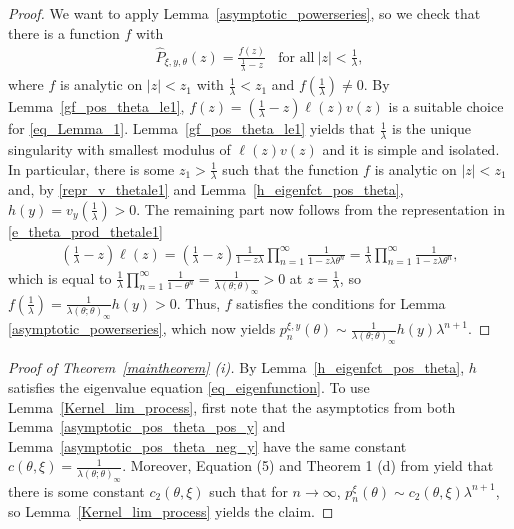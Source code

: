 \documentclass[12pt]{article}
\newcommand{\1}{\mathds{1}}
\theoremstyle{definition}
\theoremstyle{plain}
\theoremstyle{remark}
\begin{document}
\begin{proof}
    We want to apply Lemma~\ref{asymptotic_powerseries}, so we check that there is a function $f$ with
    \begin{align}
        \hat{P}_{\xi,y,\theta}(z)=\frac{f(z)}{\frac{1}{\lambda}-z}~~~~\text{for all}~|z|<\frac{1}{\lambda}\label{eq_Lemma_1},
    \end{align}
   where $f$ is analytic on $|z|<z_1$ with $\frac{1}{\lambda}<z_1$ and $f\left(\frac{1}{\lambda}\right)\neq 0$. 
   By Lemma~\ref{gf_pos_theta_le1}, $f(z)=\left(\frac{1}{\lambda}-z\right)\ell(z)v(z)$  is a suitable choice for \eqref{eq_Lemma_1}. Lemma~\ref{gf_pos_theta_le1} yields that $\frac{1}{\lambda}$ is the unique singularity with smallest modulus of $\ell(z)v(z)$ and it is simple and isolated. In particular, there is some $z_1>\frac{1}{\lambda}$ such that the function $f$ is analytic on $|z|<z_1$ and, by \eqref{repr_v_thetale1} and Lemma~\ref{h_eigenfct_pos_theta}, $h(y)=v_y\left(\frac{1}{\lambda}\right)>0$. The remaining part now follows from the representation in \eqref{e_theta_prod_thetale1}
   \begin{align*}
       \left(\frac{1}{\lambda}-z\right)\ell(z)=\left(\frac{1}{\lambda}-z\right)\frac{1}{1-z\lambda}\prod_{n=1}^\infty\frac{1}{1-z\lambda \theta^n}=\frac{1}{\lambda}\prod_{n=1}^\infty\frac{1}{1-z\lambda \theta^n},
   \end{align*}
   which is equal to $\frac{1}{\lambda}\prod_{n=1}^\infty\frac{1}{1-\theta^n}=\frac{1}{\lambda(\theta;\theta)_\infty}>0$ at $z=\frac{1}{\lambda}$, so $f\left(\frac{1}{\lambda}\right)=\frac{1}{\lambda(\theta;\theta)_\infty}h(y)>0$.
  Thus, $f$ satisfies the  conditions for Lemma \ref{asymptotic_powerseries}, which now yields $p_n^{\xi,y}(\theta)\sim \frac{1}{\lambda(\theta;\theta)_\infty}h(y)\lambda^{n+1}$.
\end{proof}
\begin{proof}[Proof of Theorem~\ref{maintheorem} (i)]
    By Lem\-ma~\ref{h_eigenfct_pos_theta}, $h$ satisfies the eigenvalue equation \eqref{eq_eigenfunction}. To use Lem\-ma~\ref{Kernel_lim_process}, first note that the asymptotics from both Lemma~\ref{asymptotic_pos_theta_pos_y} and Lemma~\ref{asymptotic_pos_theta_neg_y} have the same constant $c(\theta,\xi)=\frac{1}{\lambda(\theta;\theta)_\infty}$. Moreover, Equation (5) and Theorem 1 (d) from \cite{AR}
   yield that there is some constant $c_2(\theta,\xi)$ such that for $n\to\infty$, $p_n^{\xi}(\theta)\sim c_2(\theta,\xi)\lambda^{n+1}$, so
      Lemma~\ref{Kernel_lim_process} yields the claim.
\end{proof}
\end{document}
